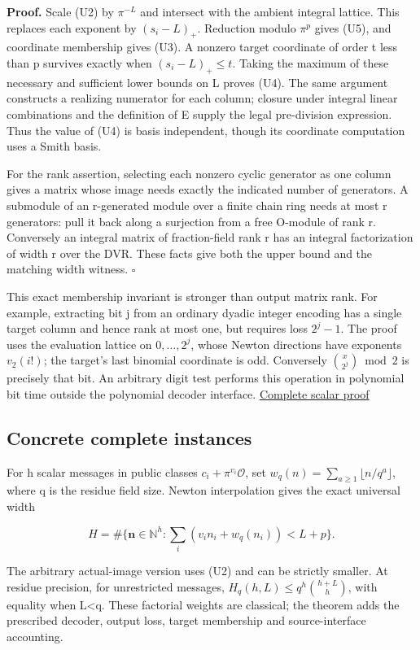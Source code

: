 \documentclass[
  11pt,
]{article}
\begin{document}
\textbf{Proof.} Scale (U2) by \(\pi^{-L}\) and intersect with the
ambient integral lattice. This replaces each exponent by \((s_i-L)_+\).
Reduction modulo \(\pi^p\) gives (U5), and coordinate membership gives
(U3). A nonzero target coordinate of order t less than p survives
exactly when \((s_i-L)_+\le t\). Taking the maximum of these necessary
and sufficient lower bounds on L proves (U4). The same argument
constructs a realizing numerator for each column; closure under integral
linear combinations and the definition of E supply the legal
pre-division expression. Thus the value of (U4) is basis independent,
though its coordinate computation uses a Smith basis.

For the rank assertion, selecting each nonzero cyclic generator as one
column gives a matrix whose image needs exactly the indicated number of
generators. A submodule of an r-generated module over a finite chain
ring needs at most r generators: pull it back along a surjection from a
free O-module of rank r. Conversely an integral matrix of fraction-field
rank r has an integral factorization of width r over the DVR. These
facts give both the upper bound and the matching width witness.
\(\square\)

This exact membership invariant is stronger than output matrix rank. For
example, extracting bit j from an ordinary dyadic integer encoding has a
single target column and hence rank at most one, but requires loss
\(2^j-1\). The proof uses the evaluation lattice on \(0,\ldots,2^j\),
whose Newton directions have exponents \(v_2(i!)\); the target's last
binomial coordinate is odd. Conversely \(\binom{x}{2^j}\bmod2\) is
precisely that bit. An arbitrary digit test performs this operation in
polynomial bit time outside the polynomial decoder interface.
\hyperref[v8-section-nonlinear-budget]{Complete scalar proof}

\subsection{Concrete complete
instances}\label{v8-concrete-complete-instances}

For h scalar messages in public classes \(c_i+\pi^{v_i}\mathcal O\), set
\(w_q(n)=\sum_{a\ge1}\lfloor n/q^a\rfloor\), where q is the residue
field size. Newton interpolation gives the exact universal width

\[
 H=\#\{\boldsymbol n\in\mathbb N^h:
       \sum_i(v_i n_i+w_q(n_i))<L+p\}. \tag{U6}
\]

The arbitrary actual-image version uses (U2) and can be strictly
smaller. At residue precision, for unrestricted messages,
\(H_q(h,L)\le q^h\binom{h+L}{h}\), with equality when L\textless q.
These factorial weights are classical; the theorem adds the prescribed
decoder, output loss, target membership and source-interface accounting.
\end{document}
